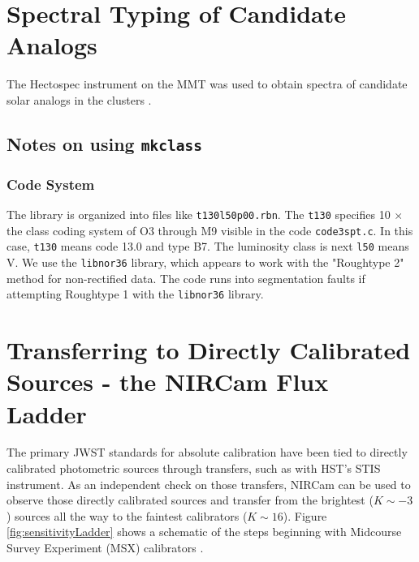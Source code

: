 \documentclass{aastex6}
\begin{document}
\section{Spectral Typing of Candidate Analogs}
The Hectospec instrument on the MMT \citep{fabricant2005hectospec,mink2007hectoFibers} was used to obtain spectra of candidate solar analogs in the clusters .

\subsection{Notes on using \texttt{mkclass}}

\subsubsection{Code System}
The library is organized into files like \texttt{t130l50p00.rbn}.
The \texttt{t130} specifies 10 $\times$ the class coding system of O3 through M9 visible in the code \texttt{code3spt.c}.
In this case, \texttt{t130} means code 13.0 and type B7.
The luminosity class is next \texttt{l50} means V.
We use the \texttt{libnor36} library, which appears to work with the "Roughtype 2" method for non-rectified data.
The code runs into segmentation faults if attempting Roughtype 1 with the \texttt{libnor36} library.

\clearpage

\section{Transferring to Directly Calibrated Sources - the NIRCam Flux Ladder}

The primary JWST standards for absolute calibration have been tied to directly calibrated photometric sources through transfers, such as with HST's STIS instrument.
As an independent check on those transfers, NIRCam can be used to observe those directly calibrated sources and transfer from the brightest ($K \sim -3$) sources all the way to the faintest calibrators ($K \sim 16$).
Figure \ref{fig:sensitivityLadder} shows a schematic of the steps beginning with Midcourse Survey Experiment (MSX) calibrators \citep{price2004msxCal}.
\end{document}
